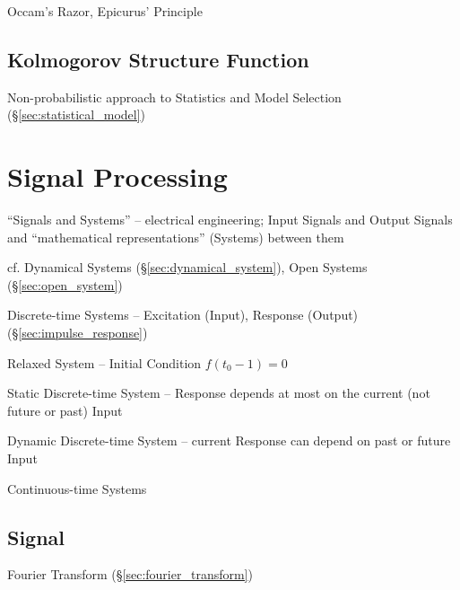 Occam's Razor, Epicurus' Principle



\subsection{Kolmogorov Structure Function}\label{sec:kolmogorov_structure}

Non-probabilistic approach to Statistics and Model Selection
(\S\ref{sec:statistical_model})



\section{Signal Processing}\label{sec:signal_processing}

``Signals and Systems'' -- electrical engineering; Input Signals and Output
Signals and ``mathematical representations'' (Systems) between them

\fist cf. Dynamical Systems (\S\ref{sec:dynamical_system}), Open Systems
(\S\ref{sec:open_system})


Discrete-time Systems -- Excitation (Input), Response (Output)
(\S\ref{sec:impulse_response})

Relaxed System -- Initial Condition $f(t_0-1) = 0$

Static Discrete-time System -- Response depends at most on the current (not
future or past) Input

Dynamic Discrete-time System -- current Response can depend on past or future
Input

Continuous-time Systems



\subsection{Signal}\label{sec:signal}

\fist Fourier Transform (\S\ref{sec:fourier_transform})

